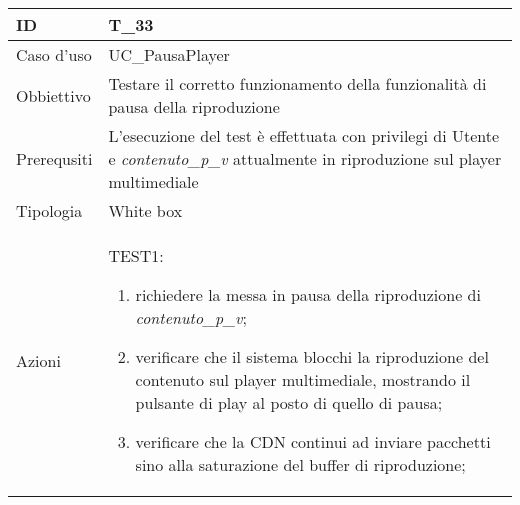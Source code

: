\begin{table}[hb]
    \centering
    \begin{tabular}{ |p{2cm}|p{10cm}|  }
        \hline
        ID          & T\_33                                                                                                                                   \\\hline
        Caso d'uso  & UC\_PausaPlayer                                                                                                                         \\\hline
        Obbiettivo  & Testare il corretto funzionamento della funzionalità di pausa della riproduzione                                                        \\\hline
        Prerequsiti & L'esecuzione del test è effettuata con privilegi di Utente e \emph{contenuto\_p\_v} attualmente in riproduzione sul player multimediale \\\hline
        Tipologia   & White box                                                                                                                               \\\hline
        Azioni      &
        TEST1:
        \begin{enumerate}[nosep, topsep=0pt]
            \item richiedere la messa in pausa della riproduzione di \emph{contenuto\_p\_v};
            \item verificare che il sistema blocchi la riproduzione del contenuto sul player multimediale, mostrando il pulsante di play al posto di quello di pausa;
            \item verificare che la CDN continui ad inviare pacchetti sino alla saturazione del buffer di riproduzione;
        \end{enumerate}
        \\\hline
    \end{tabular}
\end{table}

